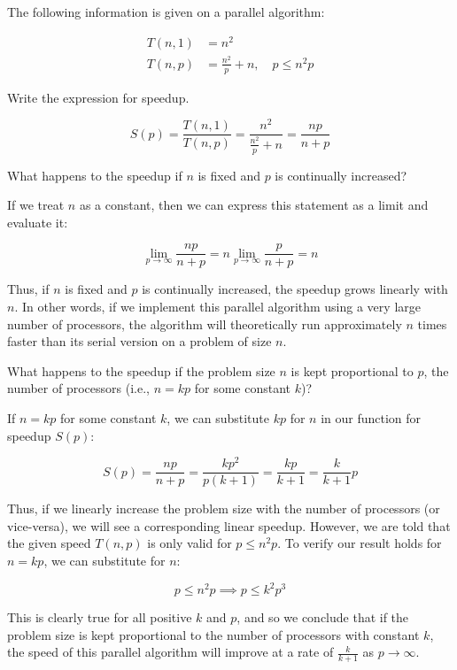 \documentclass[twoside,10pt]{article}
\newcommand{\eqn}[1]{\begin{equation*}#1\end{equation*}}
\newcommand{\aln}[1]{\begin{align*}#1\end{align*}}
\begin{document}
\section{}

The following information is given on a parallel algorithm:

\aln{
  T(n,1) &= n^2\\
  T(n,p) &= \frac{n^2}{p} + n, \quad p \leq n^2 p
}

Write the expression for speedup.

\eqn{S(p)= \dfrac{T(n,1)}{T(n,p)}= \dfrac{n^2}{\frac{n^2}{p} + n} = \dfrac{np}{n + p}
}

What happens to the speedup if $n$ is fixed and $p$ is continually increased?

\quad If we treat $n$ as a constant, then we can express this statement as a limit and evaluate it:

\eqn{\lim_{p \to \infty}{\dfrac{np}{n + p}} = n\lim_{p \to \infty}{\dfrac{p}{n + p}} = n}

\quad Thus, if $n$ is fixed and $p$ is continually increased, the speedup grows linearly with $n$.
In other words, if we implement this parallel algorithm using a very large number of processors, the algorithm will theoretically run approximately $n$ times faster than its serial version on a problem of size $n$.

\hbox{}

What happens to the speedup if the problem size $n$ is kept proportional to $p$, the number of processors (i.e., $n = kp$ for some constant $k$)?

\quad If $n = kp$ for some constant $k$, we can substitute $kp$ for $n$ in our function for speedup $S(p)$:

\eqn{S(p) = \dfrac{np}{n + p} = \dfrac{kp^2}{p(k + 1)} = \dfrac{kp}{k + 1} = \dfrac{k}{k + 1}p}

\quad Thus, if we linearly increase the problem size with the number of processors (or vice-versa), we will see a corresponding linear speedup.
However, we are told that the given speed $T(n, p)$ is only valid for $p \leq n^2p$.
To verify our result holds for $n = kp$, we can substitute for $n$:

\eqn{p \leq n^2p \implies p \leq k^2p^3}

\quad This is clearly true for all positive $k$ and $p$, and so we conclude that if the problem size is kept proportional to the number of processors with constant $k$, the speed of this parallel algorithm will improve at a rate of $\frac{k}{k+1}$ as $p \to \infty$.
\end{document}
